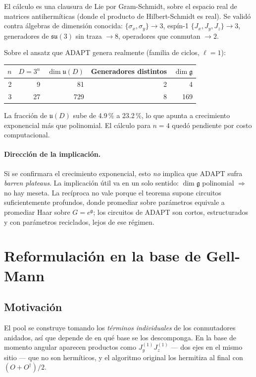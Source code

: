 \documentclass[11pt,a4paper]{article}
\newcommand{\gm}{\mathfrak{g}}
\begin{document}
El cálculo es una clausura de Lie por Gram-Schmidt, sobre el espacio real de
matrices antihermíticas (donde el producto de Hilbert-Schmidt es real). Se
validó contra álgebras de dimensión conocida: $\{\sigma_x,\sigma_y\}\to 3$,
espín-1 $\{J_x,J_y,J_z\}\to 3$, generadores de $\mathfrak{su}(3)$ sin traza
$\to 8$, operadores que conmutan $\to 2$.

Sobre el ansatz que ADAPT genera realmente (familia de ciclos, $\ell=1$):

\begin{center}
\begin{tabular}{rrrrr}
\toprule
$n$ & $D=3^n$ & $\dim\mathfrak u(D)$ & Generadores distintos & $\dim\gm$ \\
\midrule
2 & 9 & 81 & 2 & 4 \\
3 & 27 & 729 & 8 & 169 \\
\bottomrule
\end{tabular}
\end{center}

La fracción de $\mathfrak u(D)$ sube de 4.9\,\% a 23.2\,\%, lo que apunta a
crecimiento exponencial más que polinomial. El cálculo para $n=4$ quedó
pendiente por costo computacional.

\paragraph{Dirección de la implicación.} Si se confirmara el crecimiento
exponencial, esto \emph{no} implica que ADAPT sufra \emph{barren plateaus}. La
implicación útil va en un solo sentido: $\dim\gm$ polinomial $\Rightarrow$ no
hay meseta. La recíproca no vale porque el teorema supone circuitos
suficientemente profundos, donde promediar sobre parámetros equivale a
promediar Haar sobre $G=e^{\gm}$; los circuitos de ADAPT son cortos,
estructurados y con parámetros reciclados, lejos de ese régimen.

\section{Reformulación en la base de Gell-Mann}

\subsection{Motivación}

El pool se construye tomando los \emph{términos individuales} de los
conmutadores anidados, así que depende de en qué base se los descomponga. En la
base de momento angular aparecen productos como $J_y^{(1)}J_z^{(1)}$ --- dos
ejes en el mismo sitio --- que no son hermíticos, y el algoritmo original los
hermitiza al final con $(O+O^\dagger)/2$.
\end{document}
